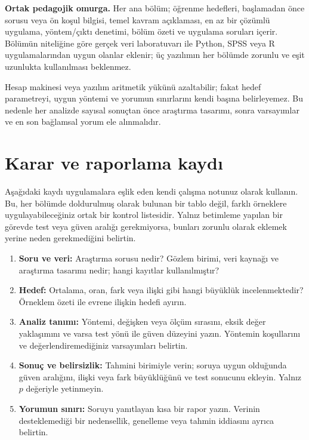 \textbf{Ortak pedagojik omurga.} Her ana bölüm; öğrenme hedefleri, başlamadan
önce sorusu veya ön koşul bilgisi, temel kavram açıklaması, en az bir çözümlü
uygulama, yöntem/çıktı denetimi, bölüm özeti ve uygulama soruları içerir.
Bölümün niteliğine göre gerçek veri laboratuvarı ile Python, SPSS veya R
uygulamalarından uygun olanlar eklenir; üç yazılımın her bölümde zorunlu ve
eşit uzunlukta kullanılması beklenmez.

Hesap makinesi veya yazılım aritmetik yükünü azaltabilir; fakat hedef
parametreyi, uygun yöntemi ve yorumun sınırlarını kendi başına belirleyemez.
Bu nedenle her analizde sayısal sonuçtan önce araştırma tasarımı, sonra
varsayımlar ve en son bağlamsal yorum ele alınmalıdır.

\section*{Karar ve raporlama kaydı}

Aşağıdaki kaydı uygulamalara eşlik eden kendi çalışma notunuz olarak
kullanın. Bu, her bölümde doldurulmuş olarak bulunan bir tablo değil,
farklı örneklere uygulayabileceğiniz ortak bir kontrol listesidir.
Yalnız betimleme yapılan bir görevde test veya güven aralığı gerekmiyorsa,
bunları zorunlu olarak eklemek yerine neden gerekmediğini belirtin.

\begin{enumerate}
  \item \textbf{Soru ve veri:} Araştırma sorusu nedir? Gözlem birimi,
  veri kaynağı ve araştırma tasarımı nedir; hangi kayıtlar kullanılmıştır?
  \item \textbf{Hedef:} Ortalama, oran, fark veya ilişki gibi hangi
  büyüklük incelenmektedir? Örneklem özeti ile evrene ilişkin hedefi ayırın.
  \item \textbf{Analiz tanımı:} Yöntemi, değişken veya ölçüm sırasını,
  eksik değer yaklaşımını ve varsa test yönü ile güven düzeyini yazın.
  Yöntemin koşullarını ve değerlendiremediğiniz varsayımları belirtin.
  \item \textbf{Sonuç ve belirsizlik:} Tahmini birimiyle verin; soruya
  uygun olduğunda güven aralığını, ilişki veya fark büyüklüğünü ve test
  sonucunu ekleyin. Yalnız $p$ değeriyle yetinmeyin.
  \item \textbf{Yorumun sınırı:} Soruyu yanıtlayan kısa bir rapor yazın.
  Verinin desteklemediği bir nedensellik, genelleme veya tahmin iddiasını
  ayrıca belirtin.
\end{enumerate}

